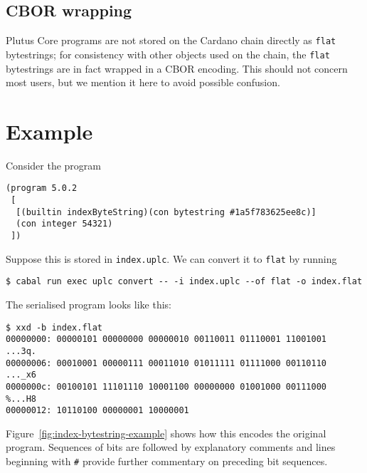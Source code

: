 \subsection{CBOR wrapping}
Plutus Core programs are not stored on the Cardano chain directly as
\texttt{flat} bytestrings; for consistency with other objects used on the chain,
the \texttt{flat} bytestrings are in fact wrapped in a CBOR encoding.  This
should not concern most users, but we mention it here to avoid possible
confusion.



\section{Example}
Consider the program
\begin{verbatim}
(program 5.0.2
 [
  [(builtin indexByteString)(con bytestring #1a5f783625ee8c)]
  (con integer 54321)
 ])
\end{verbatim}

\noindent Suppose this is stored in \texttt{index.uplc}.  We can convert it to
\texttt{flat} by running
\begin{verbatim}
$ cabal run exec uplc convert -- -i index.uplc --of flat -o index.flat
\end{verbatim}

\noindent The serialised program looks like this:

{\small
\begin{verbatim}
$ xxd -b index.flat
00000000: 00000101 00000000 00000010 00110011 01110001 11001001  ...3q.
00000006: 00010001 00000111 00011010 01011111 01111000 00110110  ..._x6
0000000c: 00100101 11101110 10001100 00000000 01001000 00111000  %...H8
00000012: 10110100 00000001 10000001
\end{verbatim}
}

\noindent Figure~\ref{fig:index-bytestring-example} shows how this encodes the
original program.  Sequences of bits are followed by explanatory comments and
lines beginning with \texttt{\#} provide further commentary on preceding bit
sequences.

\newcommand{\arrow}{$\rightarrow$}

